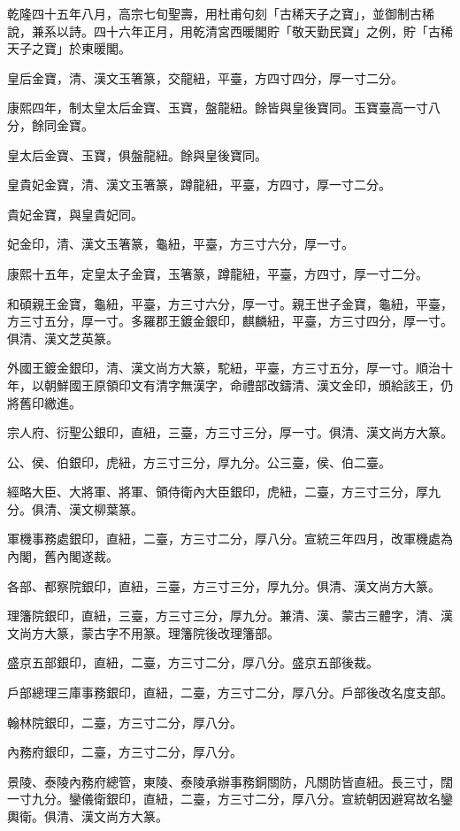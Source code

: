 \begin{pinyinscope}
乾隆四十五年八月，高宗七旬聖壽，用杜甫句刻「古稀天子之寶」，並御制古稀說，兼系以詩。四十六年正月，用乾清宮西暖閣貯「敬天勤民寶」之例，貯「古稀天子之寶」於東暖閣。

皇后金寶，清、漢文玉箸篆，交龍紐，平臺，方四寸四分，厚一寸二分。

康熙四年，制太皇太后金寶、玉寶，盤龍紐。餘皆與皇後寶同。玉寶臺高一寸八分，餘同金寶。

皇太后金寶、玉寶，俱盤龍紐。餘與皇後寶同。

皇貴妃金寶，清、漢文玉箸篆，蹲龍紐，平臺，方四寸，厚一寸二分。

貴妃金寶，與皇貴妃同。

妃金印，清、漢文玉箸篆，龜紐，平臺，方三寸六分，厚一寸。

康熙十五年，定皇太子金寶，玉箸篆，蹲龍紐，平臺，方四寸，厚一寸二分。

和碩親王金寶，龜紐，平臺，方三寸六分，厚一寸。親王世子金寶，龜紐，平臺，方三寸五分，厚一寸。多羅郡王鍍金銀印，麒麟紐，平臺，方三寸四分，厚一寸。俱清、漢文芝英篆。

外國王鍍金銀印，清、漢文尚方大篆，駝紐，平臺，方三寸五分，厚一寸。順治十年，以朝鮮國王原領印文有清字無漢字，命禮部改鑄清、漢文金印，頒給該王，仍將舊印繳進。

宗人府、衍聖公銀印，直紐，三臺，方三寸三分，厚一寸。俱清、漢文尚方大篆。

公、侯、伯銀印，虎紐，方三寸三分，厚九分。公三臺，侯、伯二臺。

經略大臣、大將軍、將軍、領侍衛內大臣銀印，虎紐，二臺，方三寸三分，厚九分。俱清、漢文柳葉篆。

軍機事務處銀印，直紐，二臺，方三寸二分，厚八分。宣統三年四月，改軍機處為內閣，舊內閣遂裁。

各部、都察院銀印，直紐，三臺，方三寸三分，厚九分。俱清、漢文尚方大篆。

理籓院銀印，直紐，三臺，方三寸三分，厚九分。兼清、漢、蒙古三體字，清、漢文尚方大篆，蒙古字不用篆。理籓院後改理籓部。

盛京五部銀印，直紐，二臺，方三寸二分，厚八分。盛京五部後裁。

戶部總理三庫事務銀印，直紐，二臺，方三寸二分，厚八分。戶部後改名度支部。

翰林院銀印，二臺，方三寸二分，厚八分。

內務府銀印，二臺，方三寸二分，厚八分。

景陵、泰陵內務府總管，東陵、泰陵承辦事務銅關防，凡關防皆直紐。長三寸，闊一寸九分。鑾儀衛銀印，直紐，二臺，方三寸二分，厚八分。宣統朝因避寫故名鑾輿衛。俱清、漢文尚方大篆。


\end{pinyinscope}
